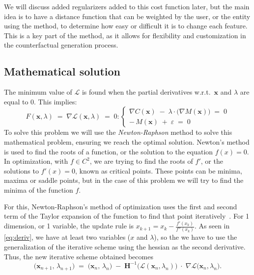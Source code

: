 \documentclass[12pt]{extarticle}
\numberwithin{equation}{section}
\begin{document}
We will discuss added regularizers added to this cost function later, but the main idea is to have a distance function that can be weighted by the user, or the entity using the method, to determine how easy or difficult it is to change each feature. This is a key part of the method, as it allows for flexibility and customization in the counterfactual generation process.

\subsection{Mathematical solution}\label{sec:mathematical}
The minimum value of $\mathcal{L}$ is found when the partial derivatives 
w.r.t.\ $\mathbf{x}$ and $\lambda$ are equal to 0. This implies:
\begin{equation}\label{eq:deriv}
F(\mathbf{x}, \lambda) \;=\; \nabla \mathcal{L}(\mathbf{x}, \lambda) \;=\; 0:
\begin{cases}
\nabla C(\mathbf{x}) \;-\;\lambda \cdot \bigl(\nabla M(\mathbf{x})\bigr) \;=\; 0 \\
-\,M(\mathbf{x})\;+\;\varepsilon\;=\;0
\end{cases}
\end{equation}
To solve this problem we will use the \emph{Newton-Raphson} method to solve this mathematical problem, ensuring we reach the optimal solution. Newton's method is used to find the roots of a function, or the solution to the equation $f(x) = 0$. In optimization, with $f \in C^2$, we are trying to find the roots of $f'$, or the solutions to $f'(x) = 0$, known as critical points. These points can be minima, maxima or saddle points, but in the case of this problem we will try to find the minima of the function $f$. \par
For this, Newton-Raphson’s method of optimization uses the first and second term of the Taylor expansion of the function to find that point iteratively~\cite{fliege2009newton}. For 1 dimension, or 1 variable, the update rule is $x_{k+1}=x_{k}-{\frac {f'(x_{k})}{f''(x_{k})}}$. As seen in \eqref{eq:deriv}, we have at least two variables ($x$ and $\lambda$), so the we have to use the generalization of the iterative scheme using the hessian as the second derivative. Thus, the new iterative scheme obtained becomes
\begin{equation}\label{eq:newton}
\bigl(\mathbf{x}_{n+1},\,\lambda_{n+1}\bigr)
\;=\;
\bigl(\mathbf{x}_n,\,\lambda_n\bigr)
\;-\;
\mathbf{H}^{-1}\!\bigl(\mathcal{L}(\mathbf{x}_n,\lambda_n)\bigr)
\;\cdot\;
\nabla\mathcal{L}\bigl(\mathbf{x}_n,\lambda_n\bigr).
\end{equation}
\end{document}
